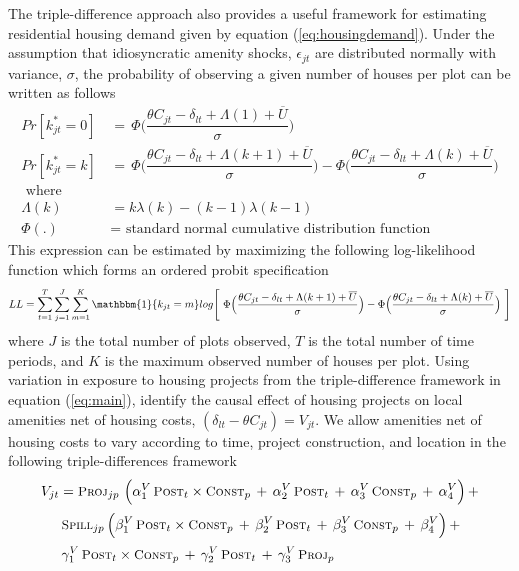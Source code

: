 \documentclass[12pt]{article}
\begin{document}
The triple-difference approach also provides a useful framework for estimating residential housing demand given by equation (\ref{eq:housingdemand}).  Under the assumption that idiosyncratic amenity shocks, $\epsilon_{jt}$ are distributed normally with variance, $\sigma$, the probability of observing a given number of houses per plot can be written as follows
\begin{align*}
Pr[ k_{jt}^{*} =0 ] \, &= \, \Phi\Bigg(\dfrac{\theta C_{jt} - \delta_{lt} + \Lambda(1) + \overline{U}}{\sigma}\Bigg) \\
Pr[ k_{jt}^{*} =k ] \, &= \, \Phi\Bigg(\dfrac{\theta C_{jt} - \delta_{lt} + \Lambda(k+1) + \overline{U}}{\sigma}\Bigg) - \Phi\Bigg(\dfrac{\theta C_{jt} - \delta_{lt} + \Lambda(k) + \overline{U}}{\sigma}\Bigg) \\
\text{ where }& \\
\Lambda(k) & =  k\lambda(k) - (k-1)\lambda(k-1)  \\
\Phi(.) &= \text{ standard normal cumulative distribution function }
\end{align*}
This expression can be estimated by maximizing the following log-likelihood function which forms an ordered probit specification
\begin{align*}
LL = \sum_{t=1}^{T} \sum_{j=1}^{J} \sum_{m=1}^{K} \mathbbm{1} \{k_{jt} = m\} log \Bigg[ \,\, \Phi\Big(\dfrac{\theta C_{jt} - \delta_{lt} + \Lambda(k+1) + \overline{U}}{\sigma}\Big) - \Phi  \Big(\dfrac{\theta C_{jt} - \delta_{lt} + \Lambda(k) + \overline{U}}{\sigma}\Big) \,\, \Bigg]
\end{align*}
\noindent where $J$ is the total number of plots observed, $T$ is the total number of time periods, and $K$ is the maximum observed number of houses per plot.  Using variation in exposure to housing projects from the triple-difference framework in equation (\ref{eq:main}), identify the causal effect of housing projects on local amenities net of housing costs, $(\delta_{lt}- \theta C_{jt} ) = V_{jt}$.  We allow amenities net of housing costs to vary according to time, project construction, and location in the following triple-differences framework
\begin{align*}
 V_{jt} &=  \textsc{\small Proj}_{jp} \,\, \Big( \alpha^{V}_1 \, \textsc{\small Post}_{t}\times\textsc{\small Const}_{p} \, + \, \alpha^{V}_2 \, \textsc{\small Post}_{t} \, + \, \alpha^{V}_3 \, \textsc{\small Const}_{p}\, +\, \alpha^{V}_4 \Big) \, + \\[.2em]
& \, \textsc{\small Spill}_{jp} \, \Big( \beta^{V}_1 \, \textsc{\small Post}_{t}\times\textsc{\small Const}_{p} \, + \, \beta^{V}_2 \, \textsc{\small Post}_{t} \, + \, \beta^{V}_3 \, \textsc{\small Const}_{p} \, +\, \beta^{V}_4 \Big) \, + \\[.2em]
& \, \gamma^{V}_1 \,  \textsc{\small Post}_{t}\times\textsc{\small Const}_{p} \, + \, \gamma^{V}_2 \,\textsc{\small Post}_{t} \, + \, \gamma^{V}_3 \,  \textsc{\small Proj}_{p}
\end{align*}
\end{document}
